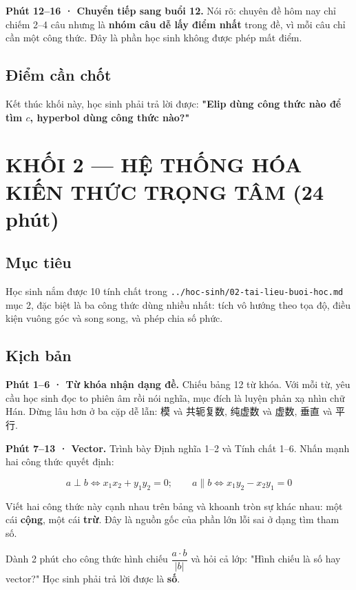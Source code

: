 \documentclass[11pt, a4paper]{article}
\begin{document}
\textbf{Phút 12–16 · Chuyển tiếp sang buổi 12.} Nói rõ: chuyên đề hôm nay chỉ chiếm 2–4 câu nhưng là \textbf{nhóm câu dễ lấy điểm nhất} trong đề, vì mỗi câu chỉ cần một công thức. Đây là phần học sinh không được phép mất điểm.

\subsection{Điểm cần chốt}

Kết thúc khối này, học sinh phải trả lời được: \textbf{"Elip dùng công thức nào để tìm $c$, hyperbol dùng công thức nào?"}

\section{KHỐI 2 — HỆ THỐNG HÓA KIẾN THỨC TRỌNG TÂM (24 phút)}

\subsection{Mục tiêu}

Học sinh nắm được 10 tính chất trong \texttt{../hoc-sinh/02-tai-lieu-buoi-hoc.md} mục 2, đặc biệt là ba công thức dùng nhiều nhất: tích vô hướng theo tọa độ, điều kiện vuông góc và song song, và phép chia số phức.

\subsection{Kịch bản}

\textbf{Phút 1–6 · Từ khóa nhận dạng đề.} Chiếu bảng 12 từ khóa. Với mỗi từ, yêu cầu học sinh đọc to phiên âm rồi nói nghĩa, mục đích là luyện phản xạ nhìn chữ Hán. Dừng lâu hơn ở ba cặp dễ lẫn: 模 và 共轭复数, 纯虚数 và 虚数, 垂直 và 平行.

\textbf{Phút 7–13 · Vector.} Trình bày Định nghĩa 1–2 và Tính chất 1–6. Nhấn mạnh hai công thức quyết định:

$$a \perp b \iff x_1x_2 + y_1y_2 = 0; \qquad a \parallel b \iff x_1y_2 - x_2y_1 = 0$$

Viết hai công thức này cạnh nhau trên bảng và khoanh tròn sự khác nhau: một cái \textbf{cộng}, một cái \textbf{trừ}. Đây là nguồn gốc của phần lớn lỗi sai ở dạng tìm tham số.

Dành 2 phút cho công thức hình chiếu $\dfrac{a \cdot b}{\lvert b \rvert}$ và hỏi cả lớp: "Hình chiếu là số hay vector?" Học sinh phải trả lời được là \textbf{số}.
\end{document}
